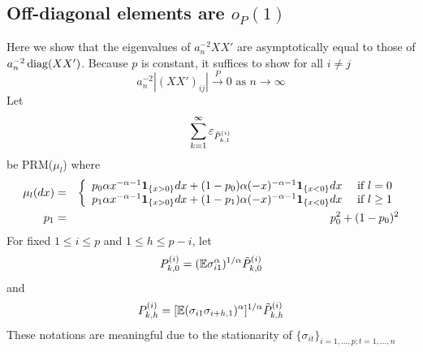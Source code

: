 \documentclass{article}
\begin{document}
\subsection[Off-diagonal elements are infinitesimally small in
probability]{Off-diagonal elements are $o_P(1)$} \label{sec:SV1}
Here we show that the eigenvalues of $a_n^{-2}XX'$ are asymptotically
equal to those of $a_n^{-2} \operatorname{diag}(XX')$. Because $p$ is constant, it
suffices to show for all $i \neq j$
$$
a_n^{-2}|(XX')_{ij}| \overset{P}{\to} 0 \text{ as } n \to \infty
$$
 Let
\[
\sum_{k=1}^\infty \varepsilon_{\tilde P^{(i)}_{k,l}}
\]
be PRM($\mu_l$) where
\begin{eqnarray*}
\mu_l (dx) &=& \left\{
  \begin{array}{lr}
    p_0 \alpha x^{-\alpha - 1} \mathbf{1}_{\{x > 0\}} dx + (1 - p_0)
    \alpha (-x)^{-\alpha - 1} \mathbf{1}_{\{x < 0\}} dx & \text{ if } l=0 \\
    p_1 \alpha x^{-\alpha - 1} \mathbf{1}_{\{x > 0\}} dx + (1 - p_1)
    \alpha (-x)^{-\alpha - 1} \mathbf{1}_{\{x < 0\}} dx & \text{ if } l \geq 1
  \end{array} \right. \\
  p_1 &=& p_0^2 + (1- p_0)^2
\end{eqnarray*}
For fixed $1 \leq i \leq p$ and $1 \leq h \leq p-i$, let
\[
P^{(i)}_{k,0} = (\mathbb{E}\sigma_{i1}^\alpha)^{1/\alpha} \tilde P^{(i)}_{k,0}
\]
and
\[
P^{(i)}_{k,h} = [\mathbb{E}(\sigma_{i1} \sigma_{i+h, 1})^\alpha]^{1/\alpha} \tilde P^{(i)}_{k,h}
\]
These notations are meaningful due to the stationarity of
$\{\sigma_{it}\}_{i=1,\dots,p; t=1,\dots,n}$
\end{document}
